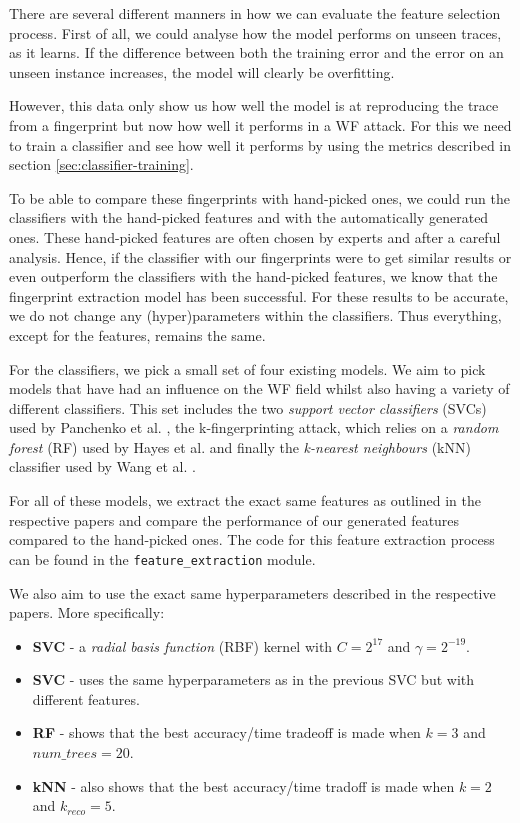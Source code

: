 There are several different manners in how we can evaluate the feature selection process.
First of all, we could analyse how the model performs on unseen traces, as it learns.
If the difference between both the training error and the error on an unseen instance increases, the model will clearly be overfitting.

However, this data only show us how well the model is at reproducing the trace from a fingerprint but now how well it performs in a WF attack.
For this we need to train a classifier and see how well it performs by using the metrics described in section \ref{sec:classifier-training}.

To be able to compare these fingerprints with hand-picked ones, we could run the classifiers with the hand-picked features and with the automatically generated ones.
These hand-picked features are often chosen by experts and after a careful analysis.
Hence, if the classifier with our fingerprints were to get similar results or even outperform the classifiers with the hand-picked features, we know that the fingerprint extraction model has been successful.
For these results to be accurate, we do not change any (hyper)parameters within the classifiers.
Thus everything, except for the features, remains the same.

For the classifiers, we pick a small set of four existing models.
We aim to pick models that have had an influence on the WF field whilst also having a variety of different classifiers.
This set includes the two \textit{support vector classifiers} (SVCs) used by Panchenko et al. \cite{panchenko1,panchenko2},
the k-fingerprinting attack, which relies on a \textit{random forest} (RF) used by Hayes et al. \cite{kfingerprinting}
and finally the \textit{k-nearest neighbours} (kNN) classifier used by Wang et al. \cite{wang_cai_johnson_nithyanand_goldberg_2014}.

For all of these models, we extract the exact same features as outlined in the respective papers and compare the performance of our generated features compared to the hand-picked ones.
The code for this feature extraction process can be found in the \texttt{feature\_extraction} module.

We also aim to use the exact same hyperparameters described in the respective papers. More specifically:
\begin{itemize}
  \item \textbf{SVC} \cite{panchenko1} - a \textit{radial basis function} (RBF) kernel with $C = 2^{17}$ and $\gamma = 2^{-19}$.
  \item \textbf{SVC} \cite{panchenko2} - uses the same hyperparameters as in the previous SVC but with different features.
  \item \textbf{RF} \cite{kfingerprinting} - shows that the best accuracy/time tradeoff is made when $k = 3$ and $\textit{num\_trees} = 20$.
  \item \textbf{kNN} \cite{wang_cai_johnson_nithyanand_goldberg_2014} - also shows that the best accuracy/time tradoff is made when $k = 2$ and $k_{\textit{reco}} = 5$.
\end{itemize}

